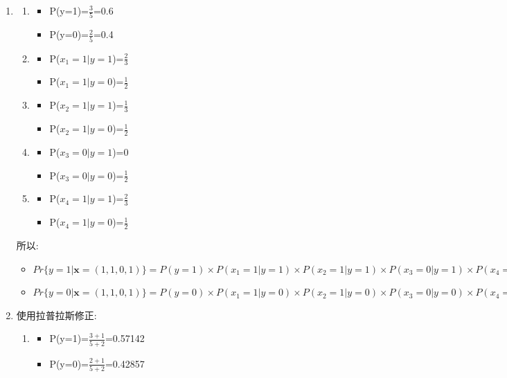 \documentclass[11pt, a4paper, UTF8]{ctexart}
\begin{document}
\begin{solution}
\begin{enumerate}
\item \begin{enumerate}
\item \begin{itemize}
\item P(y=1)=$\frac{3}{5}$=0.6
\item P(y=0)=$\frac{2}{5}$=0.4
\end{itemize}
\item \begin{itemize}
	\item P($x_1=1|y=1$)=$\frac{2}{3}$
	\item P($x_1=1|y=0$)=$\frac{1}{2}$
\end{itemize}
\item \begin{itemize}
	\item P($x_2=1|y=1$)=$\frac{1}{3}$
	\item P($x_2=1|y=0$)=$\frac{1}{2}$
\end{itemize}
\item \begin{itemize}
	\item P($x_3=0|y=1$)=$0$
	\item P($x_3=0|y=0$)=$\frac{1}{2}$
\end{itemize}
\item \begin{itemize}
	\item P($x_4=1|y=1$)=$\frac{2}{3}$
	\item P($x_4=1|y=0$)=$\frac{1}{2}$
\end{itemize}
\end{enumerate}
	所以:
	\begin{itemize}
\item $Pr\{ y=1 | \mathbf{x}=(1,1,0,1) \}=P(y=1)\times P(x_1=1|y=1)\times P(x_2=1|y=1)\times P(x_3=0|y=1) \times P(x_4=1|y=1)=0$
\item $Pr\{ y=0 | \mathbf{x}=(1,1,0,1) \}=P(y=0)\times P(x_1=1|y=0)\times P(x_2=1|y=0)\times P(x_3=0|y=0) \times P(x_4=1|y=0)=0.025$
	\end{itemize}
\item 使用拉普拉斯修正:\begin{enumerate}
	\item \begin{itemize}
	\item P(y=1)=$\frac{3+1}{5+2}$=0.57142
	\item P(y=0)=$\frac{2+1}{5+2}$=0.42857

\end{itemize}
\end{enumerate}
\end{enumerate}
\end{solution}
\end{document}
